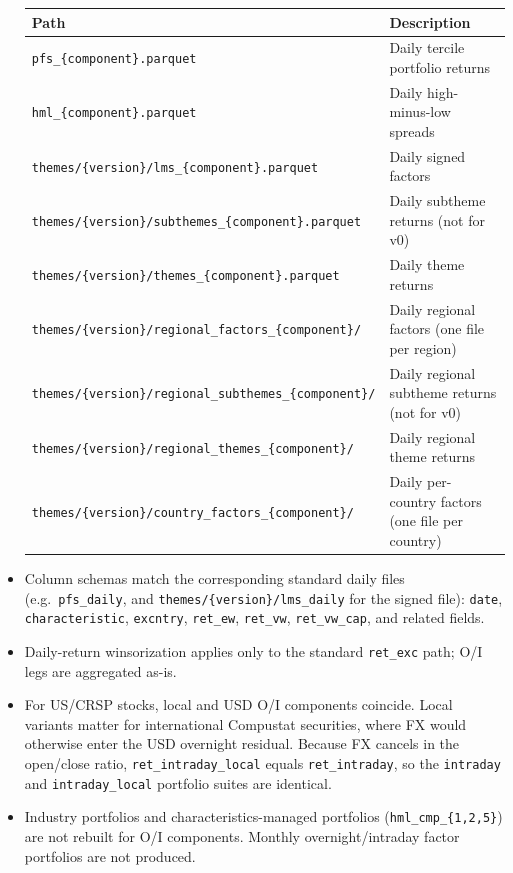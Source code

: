 \documentclass[12pt,title,fleqn]{article}
\begin{document}
\begin{itemize}
  \begin{center}
  \begin{tabular}{|l|p{8.5cm}|}
  \hline
  \textbf{Path} & \textbf{Description} \\
  \hline
  \texttt{pfs\_\{component\}.parquet} & Daily tercile portfolio returns \\
  \texttt{hml\_\{component\}.parquet} & Daily high-minus-low spreads \\
  \texttt{themes/\{version\}/lms\_\{component\}.parquet} & Daily signed factors \\
  \texttt{themes/\{version\}/subthemes\_\{component\}.parquet} & Daily subtheme returns (not for v0) \\
  \texttt{themes/\{version\}/themes\_\{component\}.parquet} & Daily theme returns \\
  \texttt{themes/\{version\}/regional\_factors\_\{component\}/} & Daily regional factors (one file per region) \\
  \texttt{themes/\{version\}/regional\_subthemes\_\{component\}/} & Daily regional subtheme returns (not for v0) \\
  \texttt{themes/\{version\}/regional\_themes\_\{component\}/} & Daily regional theme returns \\
  \texttt{themes/\{version\}/country\_factors\_\{component\}/} & Daily per-country factors (one file per country) \\
  \hline
  \end{tabular}
  \end{center}

  \item Column schemas match the corresponding standard daily files (e.g.\ \texttt{pfs\_daily}, and \texttt{themes/\{version\}/lms\_daily} for the signed file): \texttt{date}, \texttt{characteristic}, \texttt{excntry}, \texttt{ret\_ew}, \texttt{ret\_vw}, \texttt{ret\_vw\_cap}, and related fields.
  \item Daily-return winsorization applies only to the standard \texttt{ret\_exc} path; O/I legs are aggregated as-is.
  \item For US/CRSP stocks, local and USD O/I components coincide. Local variants matter for international Compustat securities, where FX would otherwise enter the USD overnight residual. Because FX cancels in the open/close ratio, \texttt{ret\_intraday\_local} equals \texttt{ret\_intraday}, so the \texttt{intraday} and \texttt{intraday\_local} portfolio suites are identical.
  \item Industry portfolios and characteristics-managed portfolios (\texttt{hml\_cmp\_\{1,2,5\}}) are not rebuilt for O/I components. Monthly overnight/intraday factor portfolios are not produced.
\end{itemize}
\end{document}

